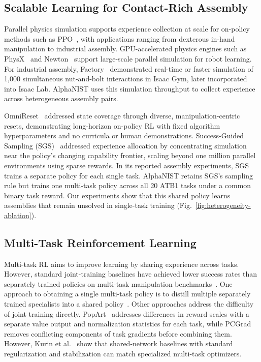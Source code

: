 \subsection{Scalable Learning for Contact-Rich Assembly}
Parallel physics simulation supports experience collection at scale for
on-policy methods such as PPO~\cite{mittal2025isaaclab, zakka2026mjlab},
with applications ranging from dexterous in-hand manipulation
\cite{andrychowicz2020dexterous, qi2023general, singh2024dextrah, handa2023dextreme}
to industrial assembly.
GPU-accelerated physics engines such as PhysX~\cite{nvidiaphysx} and
Newton~\cite{newton2025} support large-scale parallel simulation for robot learning.
For industrial assembly,
Factory~\cite{narang2022factory} demonstrated real-time or faster simulation of
1,000 simultaneous nut-and-bolt interactions in Isaac Gym, later incorporated into Isaac Lab. 
AlphaNIST uses this
simulation throughput to collect experience across heterogeneous assembly pairs.

OmniReset~\cite{yin2026omnireset} addressed state coverage through diverse,
manipulation-centric resets, demonstrating long-horizon on-policy RL with fixed
algorithm hyperparameters and no curricula or human demonstrations.
Success-Guided Sampling (SGS)~\cite{zhang2026balanceddiet} addressed experience
allocation by concentrating simulation near the policy's changing capability
frontier, scaling beyond one million parallel environments using sparse rewards.
In its reported assembly experiments, SGS trains a separate policy for
each single task. AlphaNIST retains SGS's sampling rule but trains one
multi-task policy across all 20 ATB1 tasks under a common binary task reward.
Our experiments show that this shared policy learns assemblies that
remain unsolved in single-task training
(Fig.~\ref{fig:heterogeneity-ablation}).

\subsection{Multi-Task Reinforcement Learning}
Multi-task RL aims to improve learning by sharing experience across tasks.
However, standard joint-training baselines have achieved lower success
rates than separately trained policies on multi-task manipulation
benchmarks~\cite{yu2020pcgrad}.
One approach to obtaining a single multi-task policy is to distill
multiple separately trained specialists into a shared
policy~\cite{tang2024automate}.
Other approaches address the difficulty of joint training directly.
PopArt~\cite{hessel2019popart} addresses differences in reward scales
with a separate value output and normalization statistics for each task,
while PCGrad~\cite{yu2020pcgrad} removes conflicting components of task
gradients before combining them.
However, Kurin et al.~\cite{kurin2022unitary} show that shared-network
baselines with standard regularization and stabilization can match
specialized multi-task optimizers.

